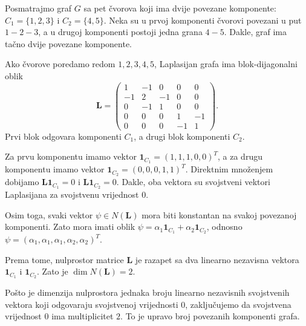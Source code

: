 \begin{example}
   Posmatrajmo graf \(G\) sa pet čvorova koji ima dvije povezane komponente:
   \(C_1=\{1,2,3\}\) i \(C_2=\{4,5\}\).
   Neka su u prvoj komponenti čvorovi povezani u put \(1 - 2 - 3\),
   a u drugoj komponenti postoji jedna grana \(4 - 5\).
   Dakle, graf ima tačno dvije povezane komponente.

   Ako čvorove poredamo redom \(1,2,3,4,5\), Laplasijan grafa ima blok-dijagonalni oblik
   \begin{equation}
   \mathbf{L}
   =
   \begin{pmatrix}
   1 & -1 & 0 & 0 & 0 \\
   -1 & 2 & -1 & 0 & 0 \\
   0 & -1 & 1 & 0 & 0 \\
   0 & 0 & 0 & 1 & -1 \\
   0 & 0 & 0 & -1 & 1
   \end{pmatrix}.
   \end{equation}
   Prvi blok odgovara komponenti \(C_1\), a drugi blok komponenti \(C_2\).

   Za prvu komponentu imamo vektor
   \(\mathbf{1}_{C_1}=(1,1,1,0,0)^T\), a za drugu komponentu imamo vektor
   \(\mathbf{1}_{C_2}=(0,0,0,1,1)^T\). Direktnim množenjem dobijamo
   \(\mathbf{L}\mathbf{1}_{C_1}=0\) i \(\mathbf{L}\mathbf{1}_{C_2}=0\).
   Dakle, oba vektora su svojstveni vektori Laplasijana za svojstvenu vrijednost \(0\).

   Osim toga, svaki vektor \(\psi\in N(\mathbf{L})\) mora biti konstantan na svakoj povezanoj
 komponenti.
   Zato mora imati oblik
   \(\psi=\alpha_1\mathbf{1}_{C_1}+\alpha_2\mathbf{1}_{C_2}\), odnosno
   \(\psi=(\alpha_1,\alpha_1,\alpha_1,\alpha_2,\alpha_2)^T\).

   Prema tome, nulprostor matrice \(\mathbf{L}\) je razapet sa dva linearno nezavisna vektora
   \(\mathbf{1}_{C_1}\) i \(\mathbf{1}_{C_2}\). Zato je \(\dim N(\mathbf{L})=2\).

   Pošto je dimenzija nulprostora jednaka broju linearno nezavisnih svojstvenih vektora koji odgovaraju
   svojstvenoj vrijednosti \(0\), zaključujemo da svojstvena vrijednost \(0\) ima multiplicitet \(2\).
 To
   je upravo broj povezanih komponenti grafa.
   \end{example}


















